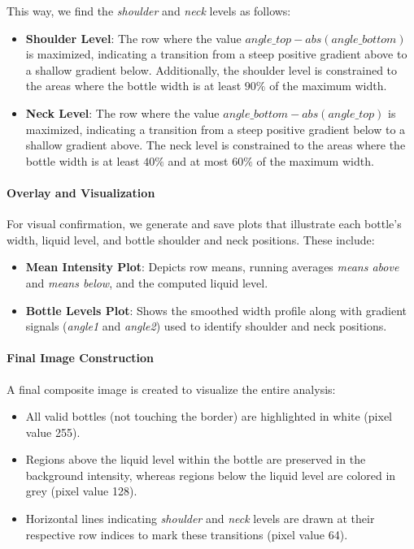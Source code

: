 \documentclass[a4paper,12pt]{article}
\begin{document}
This way, we find the \emph{shoulder} and \emph{neck} levels as follows:
\begin{itemize}
    \item \textbf{Shoulder Level}: The row where the value \(\textit{angle\_top} - abs(\textit{angle\_bottom})\) is maximized, indicating a transition from a steep positive gradient above to a shallow gradient below. Additionally, the shoulder level is constrained to the areas where the bottle width is at least \(90\%\) of the maximum width.
    \item \textbf{Neck Level}: The row where the value \(\textit{angle\_bottom} - abs(\textit{angle\_top})\) is maximized, indicating a transition from a steep positive gradient below to a shallow gradient above. The neck level is constrained to the areas where the bottle width is at least \(40\%\) and at most \(60\%\) of the maximum width.
\end{itemize}

\paragraph{Overlay and Visualization}

For visual confirmation, we generate and save plots that illustrate each bottle's width, liquid level, and bottle shoulder and neck positions. These include:
\begin{itemize}
    \item \textbf{Mean Intensity Plot}: Depicts row means, running averages \textit{means above} and \textit{means below}, and the computed liquid level.
    \item \textbf{Bottle Levels Plot}: Shows the smoothed width profile along with gradient signals (\textit{angle1} and \textit{angle2}) used to identify shoulder and neck positions.
\end{itemize}

\paragraph{Final Image Construction}

A final composite image is created to visualize the entire analysis:
\begin{itemize}
    \item All valid bottles (not touching the border) are highlighted in white (pixel value 255).
    \item Regions above the liquid level within the bottle are preserved in the background intensity, whereas regions below the liquid level are colored in grey (pixel value 128).
    \item Horizontal lines indicating \textit{shoulder} and \textit{neck} levels are drawn at their respective row indices to mark these transitions (pixel value 64).
\end{itemize}
\end{document}
